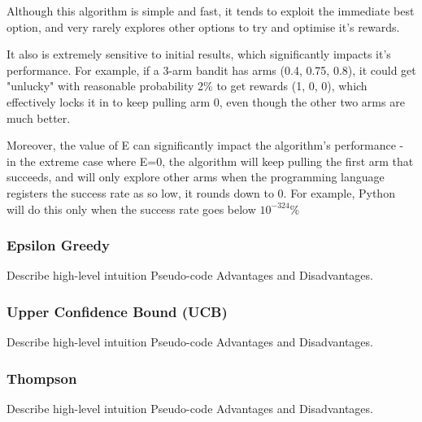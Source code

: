 Although this algorithm is simple and fast, it tends to exploit the immediate best option, and very rarely explores other options to try and optimise it's rewards.

It also is extremely sensitive to initial results, which significantly impacts it's performance. For example, if a 3-arm bandit has arms (0.4, 0.75, 0.8), it could get "unlucky" with reasonable probability 2\% to get rewards (1, 0, 0), which effectively locks it in to keep pulling arm 0, even though the other two arms are much better.

Moreover, the value of E can significantly impact the algorithm's performance - in the extreme case where E=0, the algorithm will keep pulling the first arm that succeeds, and will only explore other arms when the programming language registers the success rate as so low, it rounds down to 0. For example, Python will do this only when the success rate goes below $10^{-324}\%$

\subsubsection{Epsilon Greedy}
\label{sec:EpsilonGreedy}
Describe high-level intuition
Pseudo-code
Advantages and Disadvantages.

\subsubsection{Upper Confidence Bound (UCB)}
\label{sec:UCB}
Describe high-level intuition
Pseudo-code
Advantages and Disadvantages.

\subsubsection{Thompson}
\label{sec:Thompson}
Describe high-level intuition
Pseudo-code
Advantages and Disadvantages.